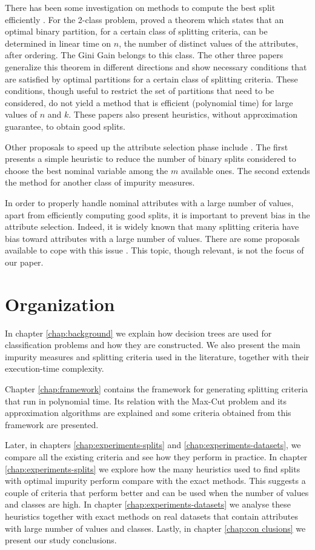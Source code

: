 There has been  some investigation on 
methods to compute the best split efficiently 
\cite{Breiman84,Chou:91,BPKN:92,journals/datamine/CoppersmithHH99}.
For the 2-class problem,  \cite{Breiman84} proved a theorem which states that an optimal
binary partition, for a certain class of splitting criteria,
can be determined in linear time on $n$, the number of distinct values of the attributes, after ordering.
The Gini  Gain belongs to this class.
The  other  three papers generalize
this theorem  in different directions 
and show necessary conditions that are satisfied by optimal partitions for a certain class of splitting criteria. 
These conditions, though useful to restrict the set of partitions
that need to be considered, do not yield  a method that
is efficient (polynomial time) for large values of $n$ and $k$.  These papers also  present  heuristics, without approximation guarantee, to obtain good splits.

Other proposals to  speed up the attribute selection phase
 include  \cite{MolaSiciliano1997,Shih2001}. 
The first presents a simple  heuristic
to reduce the number of binary splits considered to
choose the best nominal variable among the $m$ available ones.
 The second   extends the method for another class
of impurity measures.

In order to properly
handle nominal attributes with a large number of values,
apart from efficiently computing good splits, it is
important to prevent bias in the attribute selection.
Indeed, it is widely  known that many splitting criteria have bias toward
attributes with a large number of values. There are some  proposals available
to cope with this issue 
\cite{conf/icml/DobraG01,Shih2004,Hothorn:2006:URP}. 
This topic, though relevant, is not the focus of our paper.

\section{Organization}
\label{sec:organization}
In chapter \ref{chap:background} we explain how decision trees are used for classification problems and how they are constructed. We also present the main impurity measures and splitting criteria used in the literature, together with their execution-time complexity.

Chapter \ref{chap:framework} contains the framework for generating splitting criteria that run in polynomial time. Its relation with the Max-Cut problem and its approximation algorithms are explained and some criteria obtained from this framework are presented.

Later, in chapters \ref{chap:experiments-splits} and \ref{chap:experiments-datasets}, we compare all the existing criteria and see how they perform in practice. In chapter \ref{chap:experiments-splits} we explore how the many heuristics used to find splits with optimal impurity perform compare with the exact methods. This suggests a couple of criteria that perform better and can be used when the number of values and classes are high. In chapter \ref{chap:experiments-datasets} we analyse these heuristics together with exact methods on real datasets that contain attributes with large number of values and classes. Lastly, in chapter \ref{chap:con	clusions} we present our study conclusions.